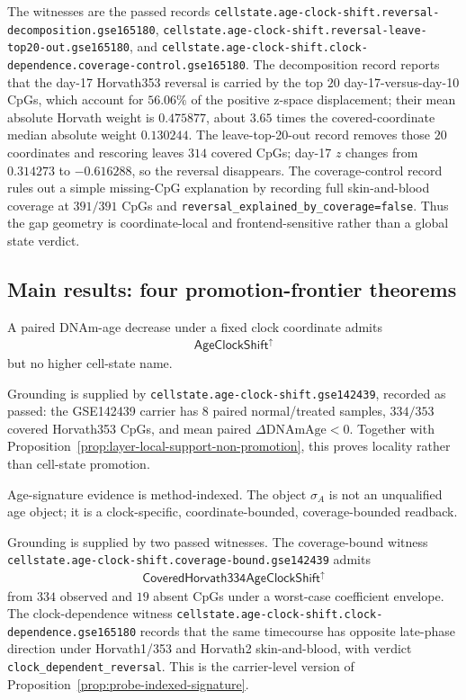 The witnesses are the passed records \texttt{cellstate.age-clock-shift.reversal-decomposition.gse165180}, \texttt{cellstate.age-clock-shift.reversal-leave-top20-out.gse165180}, and \texttt{cellstate.age-clock-shift.clock-dependence.coverage-control.gse165180}. The decomposition record reports that the day-17 Horvath353 reversal is carried by the top $20$ day-17-versus-day-10 CpGs, which account for $56.06\%$ of the positive z-space displacement; their mean absolute Horvath weight is $0.475877$, about $3.65$ times the covered-coordinate median absolute weight $0.130244$. The leave-top-20-out record removes those $20$ coordinates and rescoring leaves $314$ covered CpGs; day-17 $z$ changes from $0.314273$ to $-0.616288$, so the reversal disappears. The coverage-control record rules out a simple missing-CpG explanation by recording full skin-and-blood coverage at $391/391$ CpGs and \texttt{reversal\_explained\_by\_coverage=false}. Thus the gap geometry is coordinate-local and frontend-sensitive rather than a global state verdict.

\subsection{Main results: four promotion-frontier theorems}

\begin{theorem}
\label{thm:age-clock-shift-local}
A paired DNAm-age decrease under a fixed clock coordinate admits
$$
\begin{aligned}
\mathsf{AgeClockShift}^{\uparrow}
\end{aligned}
$$
but no higher cell-state name.
\end{theorem}

Grounding is supplied by \texttt{cellstate.age-clock-shift.gse142439}, recorded as passed: the GSE142439 carrier has $8$ paired normal/treated samples, $334/353$ covered Horvath353 CpGs, and mean paired $\Delta\mathrm{DNAmAge}<0$. Together with Proposition~\ref{prop:layer-local-support-non-promotion}, this proves locality rather than cell-state promotion.

\begin{theorem}
\label{thm:method-identity-carrier}
Age-signature evidence is method-indexed. The object $\sigma_A$ is not an unqualified age object; it is a clock-specific, coordinate-bounded, coverage-bounded readback.
\end{theorem}

Grounding is supplied by two passed witnesses. The coverage-bound witness \texttt{cellstate.age-clock-shift.coverage-bound.gse142439} admits
$$
\begin{aligned}
\mathsf{CoveredHorvath334AgeClockShift}^{\uparrow}
\end{aligned}
$$
from $334$ observed and $19$ absent CpGs under a worst-case coefficient envelope. The clock-dependence witness \texttt{cellstate.age-clock-shift.clock-dependence.gse165180} records that the same timecourse has opposite late-phase direction under Horvath1/353 and Horvath2 skin-and-blood, with verdict \texttt{clock\_dependent\_reversal}. This is the carrier-level version of Proposition~\ref{prop:probe-indexed-signature}.

